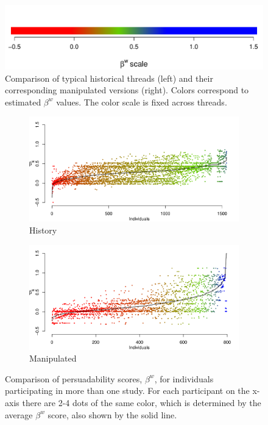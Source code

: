 \documentclass[9pt,a4paper,twocolumn,lineno]{article}
\begin{document}
\begin{figure}
	\includegraphics[width=.5\linewidth]{betascale_horizontal}

	
	\caption{Comparison of typical historical threads (left) and their corresponding manipulated versions (right). %
	Colors correspond to estimated $\beta^w$ values. The color scale is fixed across threads.}
\label{fig:more}
\end{figure}



\begin{figure}
	\centering
	\begin{subfigure}{1\linewidth}
		\centering
		\includegraphics[width=1\linewidth]{beta_history}
		\caption{\footnotesize History}
		\label{fig: betaw history}
	\end{subfigure}
	\begin{subfigure}{1\linewidth}
		\centering
		\includegraphics[width=1\linewidth]{beta_max}
		\caption{\footnotesize Manipulated}
		\label{fig: betaw manipulated}
	\end{subfigure}
	\caption{Comparison of persuadability scores, $\beta^w$, for individuals participating in more than one study. For each participant on the x-axis there are 2-4 dots of the same color, which is determined by the average $\beta^w$ score, also shown by the solid line.}
	\label{compare}
\end{figure}
\end{document}
